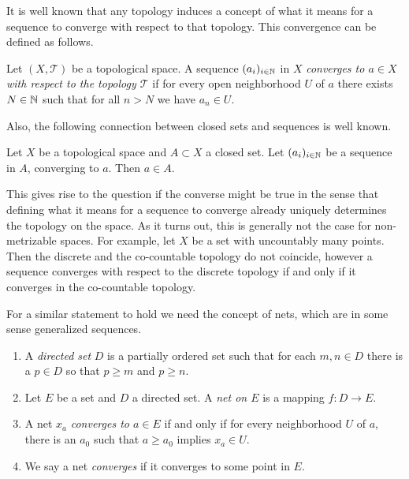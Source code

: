 It is well known that any topology induces a concept of what it means for a sequence to converge with respect to that topology. This convergence can be defined as follows.
 

\begin{definition}
	Let $(X,\mathcal{T})$ be a topological space. A sequence $(a_i)_{i\in\mathbb{N}}$ in $X$ \emph{converges to $a\in X$ with respect to the topology $\mathcal{T}$} if for every open neighborhood $U$ of $a$ there exists $N\in \mathbb{N}$ such that for all $n>N$ we have $a_n\in U$.
\end{definition}

Also, the following connection between closed sets and sequences is well known.

\begin{lemma}
	Let $X$ be a topological space and $A\subset X$ a closed set. Let $(a_i)_{i\in \mathbb{N}}$ be a sequence in $A$, converging to $a$. Then $a\in A$.
\end{lemma}

This gives rise to the question if the converse might be true in the sense that defining what it means for a sequence to converge already uniquely determines the topology on the space. As it turns out, this is generally not the case for non-metrizable spaces.
For example, let $X$ be a set with uncountably many points. Then the discrete and the co-countable topology do not coincide, however a sequence converges with respect to the discrete topology if and only if it converges in the co-countable topology.

For a similar statement to hold we need the concept of nets, which are in some sense generalized sequences.

\begin{definition}\mbox{}
	\begin{enumerate}
		\item A \emph{directed set} $D$ is a partially ordered set such that for each $m,n\in D$ there is a $p\in D$ so that $p\geq m$ and $p\geq n$.
		\item Let $E$ be a set and $D$ a directed set. A \emph{net on $E$} is a mapping $f:D\to E$.
		\item A net $x_a$ \emph{converges  to $a\in E$} if and only if for every neighborhood $U$ of $a$, there is an $a_0$ such that $a\geq a_0$ implies $x_a\in U$.
		\item We say a net \emph{converges} if it converges to some point in $E$.
	\end{enumerate}
\end{definition}


